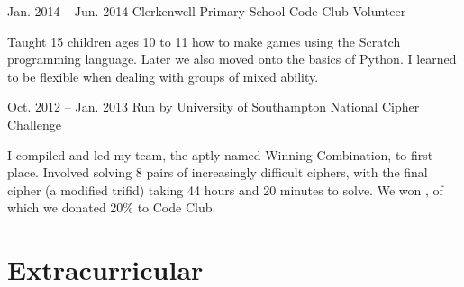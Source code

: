 \documentclass{tccv}
\begin{document}
\begin{eventlist}
        \item{Jan. 2014 -- Jun. 2014}
             {Clerkenwell Primary School}
             {Code Club Volunteer}
        
        Taught 15 children ages 10 to 11 how to make games using the Scratch programming language. Later we also moved onto the basics of Python. I learned to be flexible when dealing with groups of mixed ability.
        
        \item{Oct. 2012 -- Jan. 2013}
             {Run by University of Southampton}
             {National Cipher Challenge}
             
        I compiled and led my team, the aptly named Winning Combination, to first place. Involved solving 8 pairs of increasingly difficult ciphers, with the final cipher (a modified trifid) taking 44 hours and 20 minutes to solve. We won , of which we donated 20\% to Code Club.
    
    \end{eventlist}




\section{Extracurricular}
\end{document}
